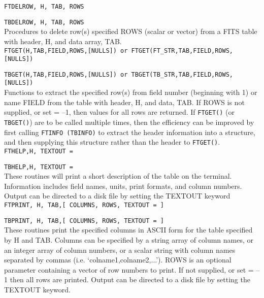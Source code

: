 \documentclass[twoside,12pt]{article}
\begin{document}
{\tt FTDELROW, H, TAB, ROWS}  

{\tt TBDELROW, H, TAB, ROWS} \\

        Procedures to delete row(s) specified ROWS (scalar or vector)
        from a FITS table with header, H, and data array, TAB. \\

{\tt FTGET(H,TAB,FIELD,ROWS,[NULLS]) or FTGET(FT\_STR,TAB,FIELD,ROWS,[NULLS])}	

{\tt TBGET(H,TAB,FIELD,ROWS,[NULLS]) or TBGET(TB\_STR,TAB,FIELD,ROWS,[NULLS])}   \\

	Functions to extract the specified row(s) from field
	number (beginning with 1) or name FIELD from the 
        table with header, H, and data, TAB.  If ROWS is not 
        supplied, or set = --1, then values for all rows are 
        returned.   If {\tt FTGET()} (or {\tt TBGET()}) are to be called multiple times, then
        the efficiency can be improved by first calling {\tt FTINFO (TBINFO)} to
     extract the header information into a structure, and then supplying this
    structure rather than the header to {\tt FTGET()}.  \\

{\tt FTHELP,H, TEXTOUT = } 

{\tt TBHELP,H, TEXTOUT = } \\

	These routines will print a short description of the table
	on the terminal.  Information includes field names, units,
        print formats, and column numbers. Output can be directed 
        to a disk file by setting the TEXTOUT keyword  \\

{\tt FTPRINT, H, TAB,[ COLUMNS, ROWS, TEXTOUT = ]} 

{\tt TBPRINT, H, TAB,[ COLUMNS, ROWS, TEXTOUT = ]} \\

	These routines print the specified columns in ASCII form
	for the table specified by H and TAB.  Columns can be
	specified by a string array of column names, or an integer
	array of column numbers, or a scalar string with column
	names separated by commas (i.e. `colname1,colname2,...').
	ROWS is an optional parameter containing a vector of row
	numbers to print.  If not supplied, or set = --1 then 
        all rows are printed.  Output can be directed to a disk
        file by setting the TEXTOUT keyword. \\
\end{document}
